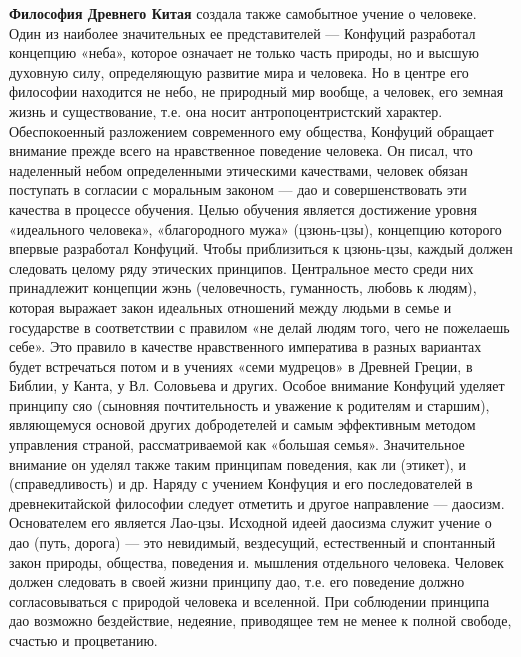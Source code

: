 \documentclass[12pt]{article}
\begin{document}
\textbf{Философия Древнего Китая} создала также самобытное учение о человеке. Один из наиболее значительных ее
представителей — Конфуций разработал концепцию «неба», которое означает не только часть природы, но и
высшую духовную силу, определяющую развитие мира и человека. Но в центре его философии находится не
небо,  не  природный  мир  вообще,  а  человек,  его  земная  жизнь  и  существование,  т.е.  она  носит
антропоцентристский характер.
Обеспокоенный  разложением  современного  ему  общества,  Конфуций  обращает  внимание  прежде  всего  на
нравственное поведение человека. Он писал, что наделенный небом определенными этическими качествами,
человек обязан поступать в согласии с моральным законом — дао и совершенствовать эти качества в процессе
обучения. Целью обучения является достижение уровня «идеального человека», «благородного мужа» (цзюнь-цзы), концепцию которого впервые разработал Конфуций. Чтобы приблизиться к цзюнь-цзы, каждый должен
следовать целому ряду этических принципов. Центральное место среди них принадлежит концепции жэнь
(человечность, гуманность, любовь к людям), которая выражает закон идеальных отношений между людьми в
семье и государстве в соответствии с правилом «не делай людям того, чего не пожелаешь себе». Это правило в
качестве нравственного императива в разных вариантах будет встречаться потом и в учениях «семи мудрецов» в
Древней Греции, в Библии, у Канта, у Вл. Соловьева и других. Особое внимание Конфуций уделяет принципу
сяо (сыновняя почтительность и уважение к родителям и старшим), являющемуся основой других добродетелей
и самым эффективным методом управления страной, рассматриваемой как «большая семья». Значительное
внимание он уделял также таким принципам поведения, как ли (этикет), и (справедливость) и др.
Наряду с учением Конфуция и его последователей в древнекитайской философии следует отметить и другое
направление — даосизм. Основателем его является Лао-цзы. Исходной идеей даосизма служит учение о дао
(путь, дорога) — это невидимый, вездесущий, естественный и спонтанный закон природы, общества, поведения
и. мышления отдельного человека. Человек должен следовать в своей жизни принципу дао, т.е. его поведение
должно  согласовываться  с  природой  человека  и  вселенной.  При  соблюдении  принципа  дао  возможно
бездействие, недеяние, приводящее тем не менее к полной свободе, счастью и процветанию.
\end{document}
